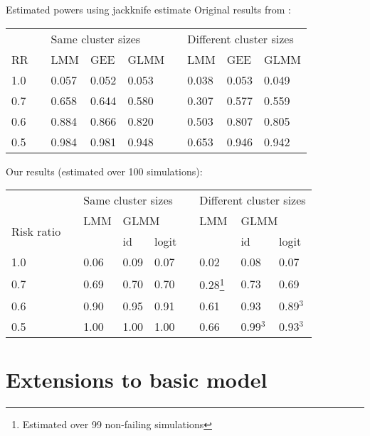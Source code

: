 \documentclass[9pt]{beamer}
\begin{document}
\begin{frame}{Estimated powers using jackknife estimate}
Original results from \citet{Hussey:2007}:
\begin{table}[h]
\small
\centering
\begin{tabular}{@{}lclllclll@{}}
\toprule
&& \multicolumn{3}{l}{Same cluster sizes} && \multicolumn{3}{l}{Different cluster sizes} \\
\cmidrule{3-5}\cmidrule{7-9}
RR & & LMM & GEE & GLMM && LMM & GEE & GLMM \\
\midrule
1.0 &&  0.057 & 0.052 & 0.053 && 0.038 & 0.053 & 0.049 \\
0.7 && 0.658 & 0.644 & 0.580 && 0.307 & 0.577 & 0.559 \\
0.6 && 0.884 & 0.866 & 0.820 && 0.503 & 0.807 & 0.805 \\
0.5 && 0.984 & 0.981 & 0.948 && 0.653 & 0.946 & 0.942 \\
\bottomrule
\end{tabular}
\end{table}
Our results (estimated over 100 simulations):
\begin{table}[h]
\small
\centering
\begin{tabular}{@{}lclllclll@{}}
\toprule
&& \multicolumn{3}{l}{Same cluster sizes} && \multicolumn{3}{l}{Different cluster sizes} \\
\cmidrule{3-5}\cmidrule{7-9}
\multirow{2}{*}{\parbox{0.75cm}{Risk ratio}} && LMM & \multicolumn{2}{l}{GLMM} && LMM & \multicolumn{2}{l}{GLMM} \\
\cmidrule{4-5}\cmidrule{8-9}
&& & id & logit && & id & logit \\
\midrule
1.0 && 0.06 & 0.09 & 0.07 && 0.02 & 0.08 & 0.07 \\
0.7 && 0.69 & 0.70 & 0.70 && 0.28\footnote{\label{fn1}Estimated over 99 non-failing simulations} & 0.73 & 0.69 \\
0.6 && 0.90 & 0.95 & 0.91 && 0.61 & 0.93 & 0.89$^{\text{3}}$ \\
0.5 && 1.00 & 1.00 & 1.00 && 0.66 & 0.99$^{\text{3}}$ & 0.93$^{\text{3}}$ \\
\bottomrule
\end{tabular}
\end{table}
\end{frame}



\section{Extensions to basic model}
\end{document}
